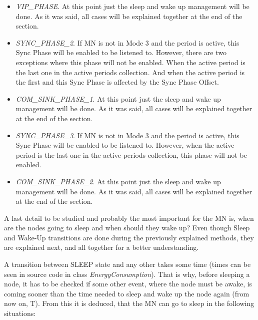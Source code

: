 \begin{itemize}
\begin{itemize}
\begin{itemize}
      \item \textit{VIP\_PHASE}. At this point just the sleep and wake up management will be done. As it was said, all cases will be explained 
      together at the end of the section.

      \item \textit{SYNC\_PHASE\_2}. If \ac{MN} is not in Mode 3 and the period is active, this Sync Phase will be enabled to be listened to. However,
      there are two exceptions where this phase will not be enabled. When the active period is the last one in the active periods collection. And when 
      the active period is the first and this Sync Phase is affected by the Sync Phase Offset.

      \item \textit{COM\_SINK\_PHASE\_1}. At this point just the sleep and wake up management will be done. As it was said, all cases will be 
      explained together at the end of the section.

      \item \textit{SYNC\_PHASE\_3}. If \ac{MN} is not in Mode 3 and the period is active, this Sync Phase will be enabled to be listened to. However,
      when the active period is the last one in the active periods collection, this phase will not be enabled.

      \item \textit{COM\_SINK\_PHASE\_2}. At this point just the sleep and wake up management will be done. As it was said, all cases will be 
      explained together at the end of the section.

    \end{itemize}
  \end{itemize}
\end{itemize}

A last detail to be studied and probably the most important for the \ac{MN} is, when are the nodes going to sleep and when should they wake up? 
Even though Sleep and Wake-Up transitions are done during the previously explained methods, they are explained next, and all together for a 
better understanding.

A transition between SLEEP state and any other takes some time (times can be seen in source code in class \textit{EnergyConsumption}). That is why,
before sleeping a node, it has to be checked if some other event, where the node must be awake, is coming sooner than the time needed to sleep and
wake up the node again (from now on, T). From this it is deduced, that the \ac{MN} can go to sleep in the following situations:

